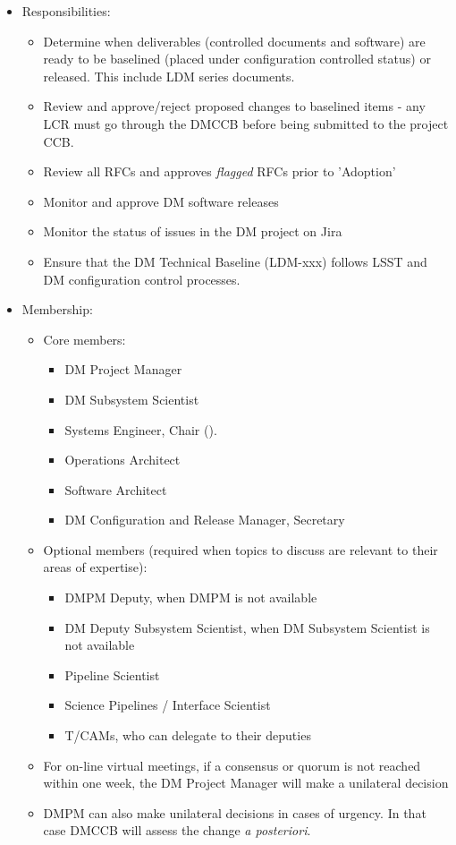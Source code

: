 \begin{itemize}
\item Responsibilities:
        \begin{itemize}
        \item Determine when deliverables (controlled documents and software) are ready to be baselined (placed under configuration controlled status) or released. This include LDM series documents.
        \item Review and approve/reject proposed changes to baselined items - any LCR must go through the DMCCB before being submitted to the project CCB.
        \item Review all RFCs and approves \textit{flagged} RFCs prior to 'Adoption'
        \item Monitor and approve DM software releases
        \item Monitor the status of issues in the DM project on Jira
        \item Ensure that the DM Technical Baseline (LDM-xxx) follows LSST and DM configuration control processes.
        \end{itemize}
\item Membership:
        \begin{itemize}
        \item Core members:
                \begin{itemize}
                \item DM Project Manager
                \item DM Subsystem Scientist
                \item Systems Engineer, Chair ().
                \item Operations Architect
                \item Software Architect
                \item DM Configuration and Release Manager, Secretary
                \end{itemize}
        \item Optional members (required when topics to discuss are relevant to their areas of expertise):
                \begin{itemize}
                \item DMPM Deputy, when DMPM is not available
                \item DM Deputy Subsystem Scientist, when DM Subsystem Scientist is not available
                \item Pipeline Scientist
                \item Science Pipelines / Interface Scientist
                \item T/CAMs, who can delegate to their deputies
                \end{itemize}
	\item For on-line virtual meetings, if a consensus or quorum is not reached within one week, the DM Project Manager will make a unilateral decision
        \item DMPM can also make unilateral decisions in cases of urgency. In that case DMCCB will assess the change \textit{a posteriori}.
	\end{itemize}
\end{itemize}

